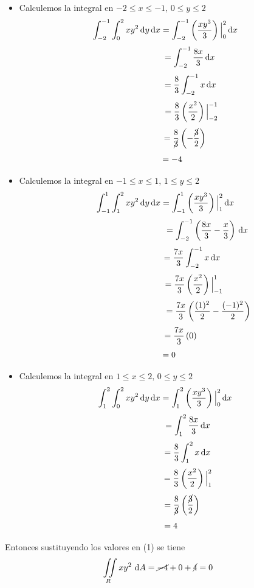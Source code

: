 \documentclass[11pt]{report}
\begin{document}
\begin{itemize}
\item Calculemos la integral en $ -2 \leq x \leq -1, \, 0 \leq y \leq 2$
\[\int^{-1}_{-2} \int^{2}_{0} xy^2 \, \text dy \, \text dx
= \int^{-1}_{-2} \left(\frac{xy^3}{3}\right)\Big|^{2}_{0} \, \text dx \]
\[\hspace{2.05cm}= \int^{-1}_{-2} \frac{8x}{3} \, \text dx \]
\[\hspace{2.1cm}= \frac{8}{3} \int^{-1}_{-2} x \, \text dx \]
\[\hspace{2.2cm}= \frac{8}{3} \left(\frac{x^2}{2}\right)\Big|^{-1}_{-2} \]
\[\hspace{1.65cm}= \frac{8}{\cancel{3}}\left(-\frac{\cancel{3}}{2}\right)\]
\[\hspace{0.6cm}= -4\]

\item Calculemos la integral en $-1 \leq x \leq 1, \, 1 \leq y \leq 2$
\[\int^{1}_{-1} \int^{2}_{1} xy^2 \, \text dy  \, \text dx
= \int^{1}_{-1} \left(\frac{xy^3}{3}\right)\Big|^{2}_{1} \, \text dx\]
\[\hspace{3.5cm}= \int^{-1}_{-2}\left(\frac{8x}{3} - \frac{x}{3} \right) \, \text dx \]
\[\hspace{2.28cm}= \frac{7x}{3}\int^{-1}_{-2} x \, \text dx \]
\[\hspace{2.4cm}= \frac{7x}{3}\left(\frac{x^2}{2}\right)\Big|^{1}_{-1}\]
\[\hspace{3.63cm}= \frac{7x}{3}\left(\frac{(1)^2}{2} - \frac{(-1)^2}{2}\right)\]
\[\hspace{1.28cm}= \frac{7x}{3}\left(0\right)\]
\[\hspace{0.34cm}= 0\]

\item Calculemos la integral en $1 \leq x \leq 2, \, 0 \leq y \leq 2  $
\[\int^{2}_{1} \int^{2}_{0} xy^2 \, \text dy \, \text dx
= \int^{2}_{1} \left(\frac{xy^3}{3}\right)\Big|^{2}_{0} \, \text dx \]
\[\hspace{1.89cm}= \int^{2}_{1} \frac{8x}{3} \, \text dx \]
\[\hspace{1.89cm}= \frac{8}{3} \int^{2}_{1} x \, \text dx \]
\[\hspace{1.9cm}= \frac{8}{3} \left(\frac{x^2}{2}\right)\Big|^{2}_{1} \]
\[\hspace{1.4cm}= \frac{8}{\cancel{3}}\left(\frac{\cancel{3}}{2}\right)\]
\[\hspace{0.46cm}= 4\]
\end{itemize}

Entonces sustituyendo los valores en (1) se tiene
\[{\displaystyle \iint \limits_R } \, xy^2 \, \, \text dA
= \cancel{-4} + 0 + \cancel{4} = 0\]
\end{document}
